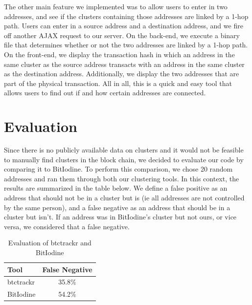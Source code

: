 \documentclass[10pt, letterpaper, twocolumn, twoside]{article}
\begin{document}
The other main feature we implemented was to allow users to enter in two addresses, and see if the clusters containing those addresses are linked by a 1-hop path. Users can enter in a source address and a destination address, and we fire off another AJAX request to our server. On the back-end, we execute a binary file that determines whether or not the two addresses are linked by a 1-hop path. On the front-end, we display the transaction hash in which an address in the same cluster as the source address transacts with an address in the same cluster as the destination address. Additionally, we display the two addresses that are part of the physical transaction. All in all, this is a quick and easy tool that allows users to find out if and how certain addresses are connected.

\section{Evaluation}

Since there is no publicly available data on clusters and it would not be feasible to manually find clusters in the block chain, we decided to evaluate our code by comparing it to BitIodine. To perform this comparison, we chose 20 random addresses and ran them through both our clustering tools. In this context, the results are summarized in the table below. We define a false positive as an address that should not be in a cluster but is (ie all addresses are not controlled by the same person), and a false negative as an address that should be in a cluster but isn't. If an address was in BitIodine's cluster but not ours, or vice versa, we considered that a false negative.

\begin{table}[h]
\caption{Evaluation of btctrackr and BitIodine}
\centering
\begin{tabular}{lc}
\hline
Tool & False Negative \\
\hline\hline	
	btctrackr & 35.8\% \\
	BitIodine & 54.2\% \\
\end{tabular}
\end{table}
\end{document}
